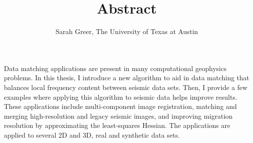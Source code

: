 \author{Sarah Greer, The University of Texas at Austin}
\title{Abstract}
\label{ch:abs}

Data matching applications are present in many computational geophysics problems.
In this thesis, I introduce a new algorithm to aid in data matching that balances local frequency content between seismic data sets.
Then, I provide a few examples where applying this algorithm to seismic data helps improve results.
These applications include multi-component image registration, matching and merging high-resolution and legacy seismic images, and improving migration resolution by approximating the least-squares Hessian.
The applications are applied to several 2D and 3D, real and synthetic data sets.
